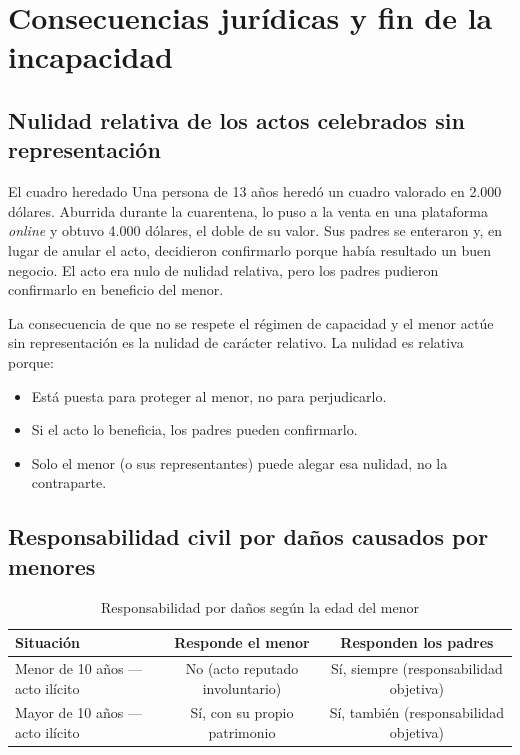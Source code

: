 \documentclass[12pt,oneside]{book}
\begin{document}
\chapter{Consecuencias jurídicas y fin de la incapacidad}

\section{Nulidad relativa de los actos celebrados sin representación}

\begin{example}{El cuadro heredado}
Una persona de 13 años heredó un cuadro valorado en 2.000 dólares. Aburrida durante la cuarentena, lo puso a la venta en una plataforma \textit{online} y obtuvo 4.000 dólares, el doble de su valor. Sus padres se enteraron y, en lugar de anular el acto, decidieron confirmarlo porque había resultado un buen negocio. El acto era nulo de nulidad relativa, pero los padres pudieron confirmarlo en beneficio del menor.
\end{example}

La consecuencia de que no se respete el régimen de capacidad y el menor actúe sin representación es la nulidad de carácter relativo. La nulidad es relativa porque:

\begin{itemize}
    \item Está puesta para proteger al menor, no para perjudicarlo.
    \item Si el acto lo beneficia, los padres pueden confirmarlo.
    \item Solo el menor (o sus representantes) puede alegar esa nulidad, no la contraparte.
\end{itemize}

\section{Responsabilidad civil por daños causados por menores}

\begin{table}[H]
\centering
\caption{Responsabilidad por daños según la edad del menor}
\begin{tabularx}{\textwidth}{Xcc}
\toprule
\textbf{Situación} & \textbf{Responde el menor} & \textbf{Responden los padres} \\
\midrule
Menor de 10 años — acto ilícito & No (acto reputado involuntario) & Sí, siempre (responsabilidad objetiva) \\
Mayor de 10 años — acto ilícito & Sí, con su propio patrimonio & Sí, también (responsabilidad objetiva) \\
\bottomrule
\end{tabularx}
\end{table}
\end{document}
